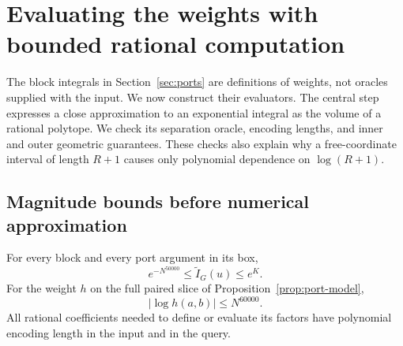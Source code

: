 \section{Evaluating the weights with bounded rational computation}
\label{sec:evaluation}

The block integrals in Section~\ref{sec:ports} are definitions of weights,
not oracles supplied with the input. We now construct their evaluators.
The central step expresses a close approximation to an exponential
integral as the volume of a rational polytope. We check its separation
oracle, encoding lengths, and inner and outer geometric guarantees.
These checks also explain why a free-coordinate interval of length
$R+1$ causes only polynomial dependence on $\log(R+1)$.

\subsection{Magnitude bounds before numerical approximation}

\begin{lemma}\label{lem:weight-bounds}
For every block and every port argument in its box,
\begin{equation}\label{eq:integral-bounds}
 e^{-N^{50000}}\le\widetilde I_G(u)\le e^K.
\end{equation}
For the weight $h$ on the full paired slice of
Proposition~\ref{prop:port-model},
\begin{equation}\label{eq:weight-log-bound}
 |\log h(a,b)|\le N^{60000}.
\end{equation}
All rational coefficients needed to define or evaluate its factors
have polynomial encoding length in the input and in the query.
\end{lemma}

